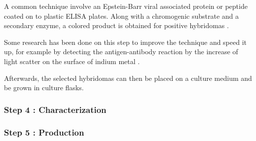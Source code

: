 A common technique involve an Epstein-Barr viral associated protein or peptide
coated on to plastic ELISA plates. Along with a chromogenic substrate and a
secondary enzyme, a colored product is obtained
for positive hybridomas \cite{nelson_monoclonal_2000}.

Some research has been done on this step to improve the technique and
speed it up, for example by detecting the antigen-antibody reaction by the 
increase of light scatter on the surface of indium metal \cite{rej_screening_1988}.

Afterwards, the selected hybridomas can then be placed on a culture medium
and be grown in culture flasks.

\subsubsection{Step 4 : Characterization}

\subsubsection{Step 5 : Production}